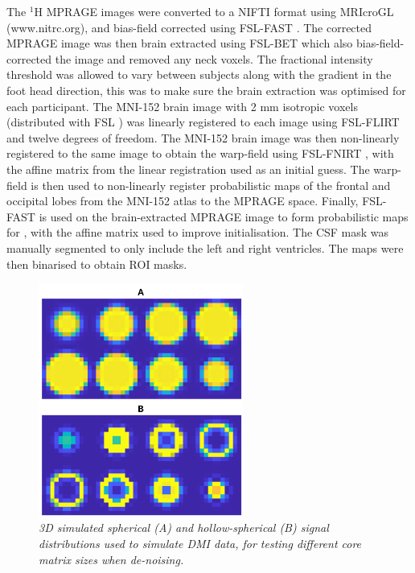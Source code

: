 The $^1$H \ac{MPRAGE} images were converted to a NIFTI format using MRIcroGL (www.nitrc.org), and bias-field corrected using FSL-FAST \cite{Zhang2001SegmentationAlgorithm}. The corrected \ac{MPRAGE} image was then brain extracted using FSL-BET \cite{Smith2002FastExtraction} which also bias-field-corrected the image and removed any neck voxels. The fractional intensity threshold was allowed to vary between subjects along with the gradient in the foot head direction, this was to make sure the brain extraction was optimised for each participant. The MNI-152 brain image with 2 mm isotropic voxels (distributed with FSL \cite{Smith2004AdvancesFSL}) was linearly registered to each image using FSL-FLIRT \cite{Jenkinson2001AImages, Jenkinson2002ImprovedImages} and twelve degrees of freedom. The MNI-152 brain image was then non-linearly registered to the same image to obtain the warp-field using FSL-FNIRT \cite{AnderssonJ2008FNIRT-FMRIBsTool}, with the affine matrix from the linear registration used as an initial guess. The warp-field is then used to non-linearly register probabilistic maps of the frontal and occipital lobes from the MNI-152 atlas to the \ac{MPRAGE} space. Finally, FSL-FAST \cite{Zhang2001SegmentationAlgorithm} is used on the brain-extracted \ac{MPRAGE} image to form probabilistic maps for , with the affine matrix used to improve initialisation. The \ac{CSF} mask was manually segmented to only include the left and right ventricles. The maps were then binarised to obtain \ac{ROI} masks. 

\begin{figure}
    \centering
    \includegraphics[width = 0.6\textwidth]{Figures/Glucose/Template.png}
    \caption{\textit{3D simulated spherical (A) and hollow-spherical (B) signal distributions used to simulate \ac{DMI} data, for testing different core matrix sizes when de-noising.}}
    \label{fig:Glu:Temp}
\end{figure}

